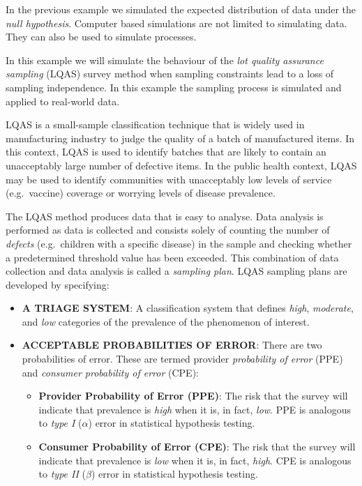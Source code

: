 \documentclass[12pt,a4paper]{book}
\theoremstyle{definition}
\theoremstyle{definition}
\theoremstyle{definition}
\theoremstyle{remark}
\begin{document}
In the previous example we simulated the expected distribution of data
under the \emph{null hypothesis}. Computer based simulations are not
limited to simulating data. They can also be used to simulate processes.

In this example we will simulate the behaviour of the \emph{lot quality
assurance sampling} (LQAS) survey method when sampling constraints lead
to a loss of sampling independence. In this example the sampling process
is simulated and applied to real-world data.

LQAS is a small-sample classification technique that is widely used in
manufacturing industry to judge the quality of a batch of manufactured
items. In this context, LQAS is used to identify batches that are likely
to contain an unacceptably large number of defective items. In the
public health context, LQAS may be used to identify communities with
unacceptably low levels of service (e.g.~vaccine) coverage or worrying
levels of disease prevalence.

The LQAS method produces data that is easy to analyse. Data analysis is
performed as data is collected and consists solely of counting the
number of \emph{defects} (e.g.~children with a specific disease) in the
sample and checking whether a predetermined threshold value has been
exceeded. This combination of data collection and data analysis is
called a \emph{sampling plan}. LQAS sampling plans are developed by
specifying:

\begin{itemize}
\item
  \textbf{A TRIAGE SYSTEM}: A classification system that defines
  \emph{high}, \emph{moderate}, and \emph{low} categories of the
  prevalence of the phenomenon of interest.
\item
  \textbf{ACCEPTABLE PROBABILITIES OF ERROR}: There are two
  probabilities of error. These are termed provider \emph{probability of
  error} (PPE) and \emph{consumer probability of error} (CPE):

  \begin{itemize}
  \item
    \textbf{Provider Probability of Error (PPE)}: The risk that the
    survey will indicate that prevalence is \emph{high} when it is, in
    fact, \emph{low}. PPE is analogous to \emph{type I} (\(\alpha\))
    error in statistical hypothesis testing.
  \item
    \textbf{Consumer Probability of Error (CPE)}: The risk that the
    survey will indicate that prevalence is \emph{low} when it is, in
    fact, \emph{high}. CPE is analogous to \emph{type II} (\(\beta\))
    error in statistical hypothesis testing.
  \end{itemize}
\end{itemize}
\end{document}
